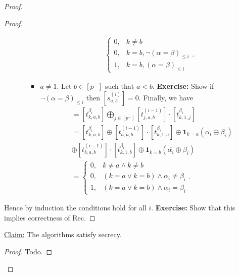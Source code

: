 \documentclass[11pt]{article}
\newcommand{\Rec}{\textsf{Rec}}
\begin{document}
\begin{proof}
\begin{proof}
\begin{itemize}
\begin{itemize}
\begin{itemize}
\begin{align*}
\begin{cases}
        0, & k \neq b\\
        0, & k = b, \lnot (\alpha = \beta)_{\le i}\\
        1, & k = b, (\alpha = \beta)_{\le i}
      \end{cases}.
    \end{align*}
    \item $a \neq 1$. Let $b \in [p^-]$ such that $a < b$. \textbf{Exercise:} Show if $\lnot (\alpha = \beta)_{\le i}$ then $[s_{a,b}^{(i)}] = 0$. Finally, we have 
    \begin{align*}
      [t_{k,a,b}^{(i)}] &= [t_{k,a,b}^{\beta_i}] \bigoplus_{j \in [p^-]} [t_{j,a,b}^{(i-1)}] \cdot [t_{k,1,j}^{\beta_i}]\\
      &= [t_{k,a,b}^{\beta_i}] \oplus [t_{a,a,b}^{(i-1)}] \cdot [t_{k,1,a}^{\beta_i}] \oplus \mathbf{1}_{k = a}(\overline{\alpha_i} \oplus \beta_i) \\
      &\oplus  [t_{b,a,b}^{(i-1)}] \cdot [t_{k,1,b}^{\beta_i}] \oplus \mathbf{1}_{k = b}(\overline{\alpha_i} \oplus \beta_i)\\
      &= \begin{cases}
      0, & k \neq a \land k \neq b\\
      0, & (k = a \lor k = b) \land \alpha_i \neq \beta_i\\
      1, & (k = a \lor k = b) \land \alpha_i = \beta_i
      \end{cases}.
    \end{align*}
  \end{itemize}
\end{itemize}
\end{itemize}
Hence by induction the conditions hold for all $i$. \textbf{Exercise:} Show that this implies correctness of \Rec.
\end{proof}
\underline{Claim:} The algorithms satisfy secrecy.
\begin{proof}
Todo.
\end{proof}
\end{proof}
\end{document}
